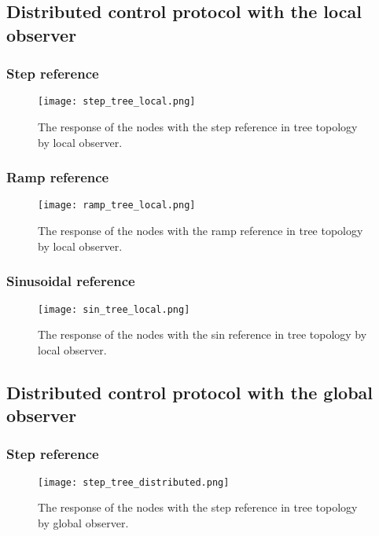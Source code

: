 \subsection{Distributed control protocol with the local observer}
\subsubsection{Step reference}
\begin{figure}[H] %
    \centering
    \texttt{[image: step\_tree\_local.png]} %
    \caption{The response of the nodes with the step reference in tree topology by local observer.}
\end{figure}

\subsubsection{Ramp reference}
\begin{figure}[H] %
    \centering
    \texttt{[image: ramp\_tree\_local.png]} %
    \caption{The response of the nodes with the ramp reference in tree topology by local observer.}
\end{figure}


\subsubsection{Sinusoidal reference}
\begin{figure}[H] %
    \centering
    \texttt{[image: sin\_tree\_local.png]} %
    \caption{The response of the nodes with the sin reference in tree topology by local observer.}
\end{figure}



\subsection{Distributed control protocol with the global observer}
\subsubsection{Step reference}
\begin{figure}[H] %
    \centering
    \texttt{[image: step\_tree\_distributed.png]} %
    \caption{The response of the nodes with the step reference in tree topology by global observer.}
\end{figure}

